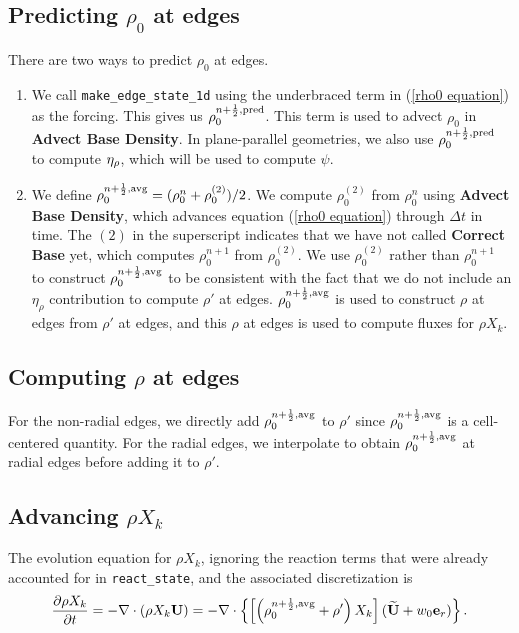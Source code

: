 \subsection{Predicting $\rho_0$ at edges}\label{Predicting rho0 at edges}
There are two ways to predict $\rho_0$ at edges.
\begin{enumerate}

\item We call {\tt make\_edge\_state\_1d} using the underbraced term
in (\ref{rho0 equation}) as the forcing.  This gives us
$\rho_0^{n+\frac{1}{2},{\rm pred}}$.  This term is used to advect $\rho_0$
in {\bf Advect Base Density}.  In plane-parallel geometries, we also use
$\rho_0^{n+\frac{1}{2},{\rm pred}}$ to compute $\eta_{\rho}$, which will be used 
to compute $\psi$.

\item We define $\rho_0^{n+\frac{1}{2},{\rm avg}} = (\rho_0^n +
\rho_0^{(2)})/2$.  We compute $\rho_0^{(2)}$ from $\rho_0^n$ using
{\bf Advect Base Density}, which advances equation (\ref{rho0 equation})
through $\Delta t$ in time.  The $(2)$ in the superscript indicates
that we have not called {\bf Correct Base} yet, which computes
$\rho_0^{n+1}$ from $\rho_0^{(2)}$.  We use $\rho_0^{(2)}$ rather than
$\rho_0^{n+1}$ to construct $\rho_0^{n+\frac{1}{2},{\rm avg}}$ to be
consistent with the fact that we do not include an $\eta_\rho$
contribution to compute $\rho'$ at edges.  $\rho_0^{n+\frac{1}{2},{\rm
avg}}$ is used to construct $\rho$ at edges from $\rho'$ at edges, and
this $\rho$ at edges is used to compute fluxes for $\rho X_k$.
\end{enumerate}

\subsection{Computing $\rho$ at edges}\label{Computing rho at edges}
For the non-radial edges, we directly add $\rho_0^{n+\frac{1}{2},{\rm avg}}$
to $\rho'$ since $\rho_0^{n+\frac{1}{2},{\rm avg}}$ is a cell-centered
quantity.  For the radial edges, we interpolate to obtain
$\rho_0^{n+\frac{1}{2},{\rm avg}}$ at radial edges before adding it to
$\rho'$.

\subsection{Advancing $\rho X_k$}\label{Advancing rhoX_k}
The evolution equation for $\rho X_k$, ignoring the reaction terms
that were already accounted for in {\tt react\_state}, and the
associated discretization is
\begin{equation}
\frac{\partial\rho X_k}{\partial t} = -\nabla\cdot(\rho X_k{\bf U}) = 
-\nabla\cdot\left\{\left[\left(\rho_0^{n+\frac{1}{2},{\rm avg}} 
+ \rho'\right)X_k\right](\widetilde{{\bf U}}+w_0{\bf e}_r)\right\}.
\end{equation}


